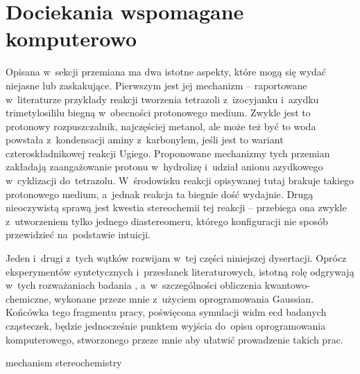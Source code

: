 \chapter{Dociekania wspomagane komputerowo}\label{chapter:numeric}

Opisana w~sekcji \textit{} przemiana ma dwa istotne aspekty,
  które mogą się wydać niejasne lub zaskakujące.
Pierwszym jest jej mechanizm \--- raportowane w~literaturze przykłady reakcji tworzenia tetrazoli
  z~izocyjanku i~azydku trimetylosililu biegną w~obecności protonowego medium.
Zwykle jest to protonowy rozpuszczalnik, najczęściej metanol, ale może też być to woda powstała
  z~kondensacji aminy z~karbonylem, jeśli jest to wariant czteroskładnikowej reakcji Ugiego.
Proponowane mechanizmy tych przemian zakładają zaangażowanie protonu w~hydrolizę 
  i~udział anionu azydkowego w~cyklizacji do~tetrazolu.
W~środowisku reakcji opisywanej tutaj brakuje takiego protonowego medium, a~jednak reakcja
  ta biegnie dość wydajnie.
Drugą nieoczywistą sprawą jest kwestia stereochemii tej reakcji \--- przebiega ona zwykle
  z~utworzeniem tylko jednego diastereomeru, którego konfiguracji nie sposób przewidzieć
  na~podstawie intuicji.

Jeden i~drugi z~tych wątków rozwijam w~tej części niniejszej dysertacji.
Oprócz eksperymentów syntetycznych i~przesłanek literaturowych, istotną rolę odgrywają w~tych
  rozważaniach badania , a~w~szczególności obliczenia kwantowo-chemiczne,
  wykonane przeze mnie z~użyciem oprogramowania Gaussian.
Końcówka tego fragmentu pracy, poświęcona symulacji widm \gls{ecd} badanych
  cząsteczek, będzie jednocześnie punktem wyjścia do~opisu oprogramowania komputerowego,
  stworzonego przeze mnie aby ułatwić prowadzenie takich prac.

{mechanism}
{stereochemistry}

